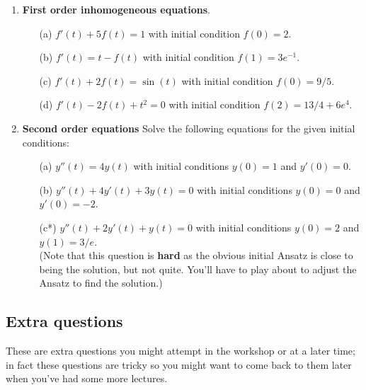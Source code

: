 \documentclass[11pt,a4paper]{scrartcl}
\begin{document}
\begin{enumerate}
\item \textbf{First order inhomogeneous equations}.
	\begin{itemize}
		\item[(a)] $f'(t) + 5f(t) = 1$ with initial condition $f(0) = 2$.
		\item[(b)] $f'(t) = t - f(t)$ with initial condition $f(1) = 3e^{-1}$.
		\item[(c)] $f'(t) +2f(t) = \sin(t)$ with initial condition $f(0) = 9/5$.
		\item[(d)] $f'(t) - 2f(t) + t^2 = 0$ with initial condition $f(2) = 13/4 + 6e^4$.
	\end{itemize}


\item \textbf{Second order equations} Solve the following equations for the given initial conditions:
	\begin{itemize}
		\item[(a)] ${y}''(t) = 4y(t)$ with initial conditions $y(0) = 1$ and ${y}'(0) = 0$.
		\item[(b)] ${y}''(t) + 4{y}'(t) + 3y(t) = 0$ with initial conditions $y(0) = 0$ and ${y}'(0) = -2$.
		\item[(c*)] ${y}''(t) + 2{y}'(t) + y(t) = 0$ with initial conditions $y(0) = 2$ and $y(1) = 3/e$.\\
        (Note that this question is \textbf{hard} as the obvious initial Ansatz is close to being the solution, but not quite. You'll have to play about to adjust the Ansatz to find the solution.)  
        \end{itemize}

\end{enumerate}
        
\subsection*{Extra questions}

These are extra questions you might attempt in the workshop or at a
later time; in fact these questions are tricky so you might want to
come back to them later when you've had some more lectures.
\end{document}
